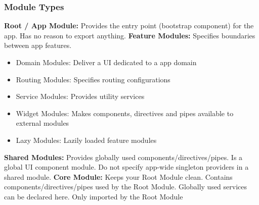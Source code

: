 \subsubsection{Module Types}
\textbf{Root / App Module:} Provides the entry point (bootstrap component) for the app.
Has no reason to export anything.
\textbf{Feature Modules:} Specifies boundaries between app features.
\begin{itemize}
    \item Domain Modules: Deliver a UI dedicated to a app domain
    \item Routing Modules: Specifies routing configurations
    \item Service Modules: Provides utility services
    \item Widget Modules: Makes components, directives and pipes available to external modules
    \item Lazy Modules: Lazily loaded feature modules
\end{itemize}
\textbf{Shared Modules:} Provides globally used components/directives/pipes.
Is a global UI component module.
Do not specify app-wide singleton providers in a shared module.
\textbf{Core Module:} Keeps your Root Module clean.
Contains components/directives/pipes used by the Root Module.
Globally used services can be declared here.
Only imported by the Root Module


